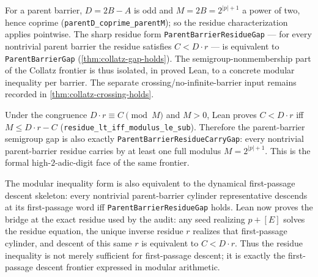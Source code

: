 \begin{theorem}
  \label{thm:collatz-residue-gap-reduces}
  \leanok
  For a parent barrier, $D=2B-A$ is odd and $M=2B=2^{|p|+1}$ a power of two,
  hence coprime (\texttt{parentD\_coprime\_parentM}); so the residue
  characterization applies pointwise. The sharp residue form
  \texttt{ParentBarrierResidueGap} --- for every nontrivial parent barrier the
  residue satisfies $C<D\cdot r$ --- is equivalent to \texttt{ParentBarrierGap}
  (\cref{thm:collatz-gap-holds}). The semigroup-nonmembership part of the Collatz
  frontier is thus isolated, in proved Lean, to a concrete modular inequality per
  barrier. The separate crossing/no-infinite-barrier input remains recorded in
  \cref{thm:collatz-crossing-holds}.
\end{theorem}
\begin{theorem}
  \label{thm:collatz-residue-gap-carry}
  \leanok
  Under the congruence \(D\cdot r\equiv C\pmod M\) and \(M>0\), Lean proves
  \(C<D\cdot r\) iff \(M\le D\cdot r-C\)
  (\texttt{residue\_lt\_iff\_modulus\_le\_sub}). Therefore the parent-barrier
  semigroup gap is also exactly \texttt{ParentBarrierResidueCarryGap}: every
  nontrivial parent-barrier residue carries by at least one full modulus
  \(M=2^{|p|+1}\). This is the formal high-\(2\)-adic-digit face of the same
  frontier.
\end{theorem}
\begin{theorem}
  \label{thm:collatz-residue-gap-cylinder-descent}
  \leanok
  The modular inequality form is also equivalent to the dynamical first-passage
  descent skeleton: every nontrivial parent-barrier cylinder representative
  descends at its first-passage word iff \texttt{ParentBarrierResidueGap} holds.
  Lean now proves the bridge at the exact residue used by the audit: any seed
  realizing \(p{+}[E]\) solves the residue equation, the unique inverse residue
  \(r\) realizes that first-passage cylinder, and descent of this same \(r\) is
  equivalent to \(C<D\cdot r\). Thus the residue inequality is not merely
  sufficient for first-passage descent; it is exactly the first-passage descent
  frontier expressed in modular arithmetic.
\end{theorem}

